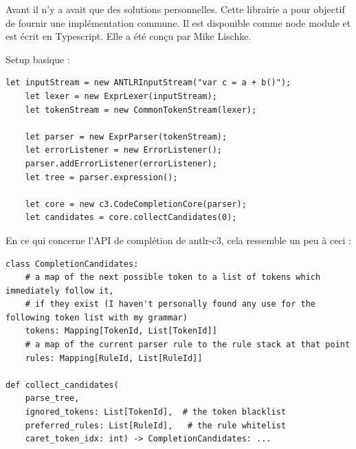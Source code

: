 \documentclass[
    iict, %
    il, %
]{heig-tb}
\begin{document}








Avant il n'y a avait que des solutions personnelles. Cette librairie a pour objectif de fournir une implémentation commune. Il est disponible comme node module et est écrit en Typescript.
Elle a été conçu par Mike Lischke.

Setup basique :

\begin{lstlisting}[frame=single]
    let inputStream = new ANTLRInputStream("var c = a + b()");
    let lexer = new ExprLexer(inputStream);
    let tokenStream = new CommonTokenStream(lexer);

    let parser = new ExprParser(tokenStream);
    let errorListener = new ErrorListener();
    parser.addErrorListener(errorListener);
    let tree = parser.expression();

    let core = new c3.CodeCompletionCore(parser);
    let candidates = core.collectCandidates(0);
\end{lstlisting}

En ce qui concerne l'API de complétion de antlr-c3, cela ressemble un peu à ceci :

\begin{lstlisting}[frame=single]
class CompletionCandidates:
    # a map of the next possible token to a list of tokens which immediately follow it,
    # if they exist (I haven't personally found any use for the following token list with my grammar)
    tokens: Mapping[TokenId, List[TokenId]]
    # a map of the current parser rule to the rule stack at that point
    rules: Mapping[RuleId, List[RuleId]]

def collect_candidates(
    parse_tree,
    ignored_tokens: List[TokenId],  # the token blacklist
    preferred_rules: List[RuleId],   # the rule whitelist
    caret_token_idx: int) -> CompletionCandidates: ...
\end{lstlisting}
\end{document}
